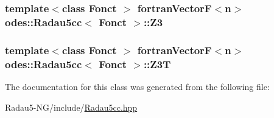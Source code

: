 \subsubsection[{Z3}]{\setlength{\rightskip}{0pt plus 5cm}template$<$class Fonct $>$ {\bf fortran\+Vector\+F}$<${\bf n}$>$ {\bf odes\+::\+Radau5cc}$<$ Fonct $>$\+::Z3\hspace{0.3cm}{\ttfamily [protected]}}\label{classodes_1_1Radau5cc_a5b34e13256e93e89d9e8e5a9d00c9431}
\hypertarget{classodes_1_1Radau5cc_a5f581024591f9a6b4097994b8a9525a1}{}
\subsubsection[{Z3\+T}]{\setlength{\rightskip}{0pt plus 5cm}template$<$class Fonct $>$ {\bf fortran\+Vector\+F}$<${\bf n}$>$ {\bf odes\+::\+Radau5cc}$<$ Fonct $>$\+::Z3\+T\hspace{0.3cm}{\ttfamily [protected]}}\label{classodes_1_1Radau5cc_a5f581024591f9a6b4097994b8a9525a1}


The documentation for this class was generated from the following file\+:\begin{DoxyCompactItemize}
\item 
Radau5-\/\+N\+G/include/\hyperlink{Radau5cc_8hpp}{Radau5cc.\+hpp}\end{DoxyCompactItemize}
